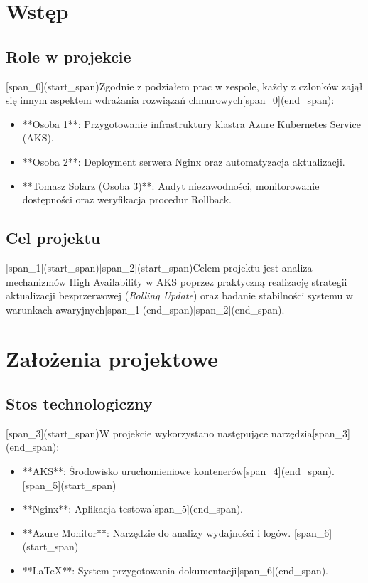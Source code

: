 \section{Wstęp}

\subsection{Role w projekcie}
[span_0](start_span)Zgodnie z podziałem prac w zespole, każdy z członków zajął się innym aspektem wdrażania rozwiązań chmurowych[span_0](end_span):
\begin{itemize}
    \item **Osoba 1**: Przygotowanie infrastruktury klastra Azure Kubernetes Service (AKS).
    \item **Osoba 2**: Deployment serwera Nginx oraz automatyzacja aktualizacji.
    \item **Tomasz Solarz (Osoba 3)**: Audyt niezawodności, monitorowanie dostępności oraz weryfikacja procedur Rollback.
\end{itemize}

\subsection{Cel projektu}
[span_1](start_span)[span_2](start_span)Celem projektu jest analiza mechanizmów High Availability w AKS poprzez praktyczną realizację strategii aktualizacji bezprzerwowej (\textit{Rolling Update}) oraz badanie stabilności systemu w warunkach awaryjnych[span_1](end_span)[span_2](end_span).

\section{Założenia projektowe}

\subsection{Stos technologiczny}
[span_3](start_span)W projekcie wykorzystano następujące narzędzia[span_3](end_span):
\begin{itemize}
    [span_4](start_span)\item **AKS**: Środowisko uruchomieniowe kontenerów[span_4](end_span).
    [span_5](start_span)\item **Nginx**: Aplikacja testowa[span_5](end_span).
    \item **Azure Monitor**: Narzędzie do analizy wydajności i logów.
    [span_6](start_span)\item **LaTeX**: System przygotowania dokumentacji[span_6](end_span).
\end{itemize}

